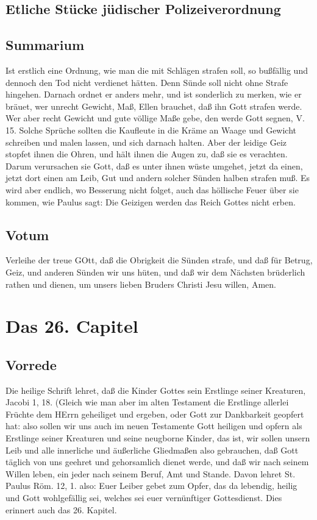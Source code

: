 \section{Etliche Stücke jüdischer Polizeiverordnung}

\section{Summarium}

Ist erstlich eine Ordnung, wie man die mit Schlägen strafen soll, so bußfällig und dennoch den Tod nicht verdienet hätten. Denn Sünde soll nicht ohne Strafe hingehen. Darnach ordnet er anders mehr, und ist sonderlich zu merken, wie er bräuet, wer unrecht Gewicht, Maß, Ellen brauchet, daß ihn Gott strafen werde. Wer aber recht Gewicht und gute völlige Maße gebe, den werde Gott segnen, V. 15. Solche Sprüche sollten die Kaufleute in die Kräme an Waage und Gewicht schreiben und malen lassen, und sich darnach halten. Aber der leidige Geiz stopfet ihnen die Ohren, und hält ihnen die Augen zu, daß sie es verachten. Darum verursachen sie Gott, daß es unter ihnen wüste umgehet, jetzt da einen, jetzt dort einen am Leib, Gut und andern solcher Sünden halben strafen muß. Es wird aber endlich, wo Besserung nicht folget, auch das höllische Feuer über sie kommen, wie Paulus sagt: Die Geizigen werden das Reich Gottes nicht erben.

\section{Votum}

Verleihe der treue GOtt, daß die Obrigkeit die Sünden strafe, und daß für Betrug, Geiz, und anderen Sünden wir uns hüten, und daß wir dem Nächsten brüderlich rathen und dienen, um unsers lieben Bruders Christi Jesu willen, Amen.

\chapter{Das 26. Capitel}

\section{Vorrede}

Die heilige Schrift lehret, daß die Kinder Gottes sein Erstlinge seiner Kreaturen, Jacobi 1, 18. (Gleich wie man aber im alten Testament die Erstlinge allerlei Früchte dem HErrn geheiliget und ergeben, oder Gott zur Dankbarkeit geopfert hat: also sollen wir uns auch im neuen Testamente Gott heiligen und opfern als Erstlinge seiner Kreaturen und seine neugborne Kinder, das ist, wir sollen unsern Leib und alle innerliche und äußerliche Gliedmaßen also gebrauchen, daß Gott täglich von uns geehret und gehorsamlich dienet werde, und daß wir nach seinem Willen leben, ein jeder nach seinem Beruf, Amt und Stande. Davon lehret St. Paulus Röm. 12, 1. also: Euer Leiber gebet zum Opfer, das da lebendig, heilig und Gott wohlgefällig sei, welches sei euer vernünftiger Gottesdienst. Dies erinnert auch das 26. Kapitel.

